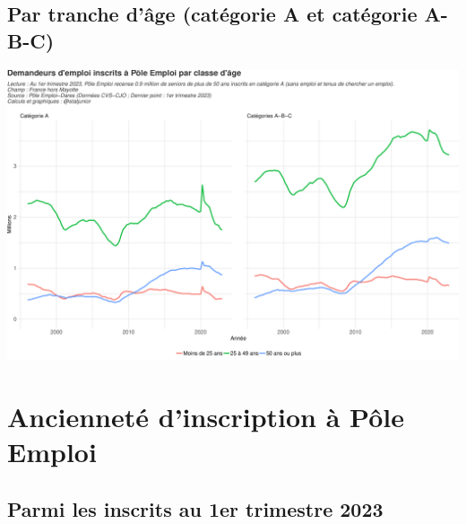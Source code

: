 \documentclass[
  paper=a4,
  ,captions=tableheading
]{scrartcl}
\begin{document}
\hypertarget{par-tranche-duxe2ge-catuxe9gorie-a-et-catuxe9gorie-a-b-c}{%
\subsection{Par tranche d'âge (catégorie A et catégorie
A-B-C)}\label{par-tranche-duxe2ge-catuxe9gorie-a-et-catuxe9gorie-a-b-c}}

\includegraphics{rapport_pdf_demandeurs_emploi_pole_emploi_files/figure-latex/unnamed-chunk-9-1.pdf}

\hypertarget{anciennetuxe9-dinscription-uxe0-puxf4le-emploi}{%
\section{Ancienneté d'inscription à Pôle
Emploi}\label{anciennetuxe9-dinscription-uxe0-puxf4le-emploi}}

\hypertarget{parmi-les-inscrits-au-1er-trimestre-2023}{%
\subsection{Parmi les inscrits au 1er trimestre
2023}\label{parmi-les-inscrits-au-1er-trimestre-2023}}
\end{document}

